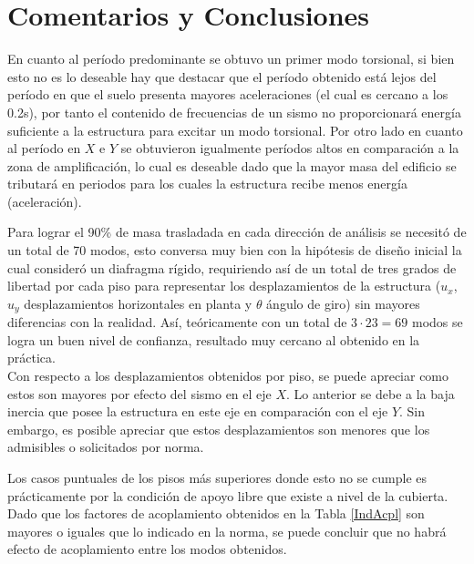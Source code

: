 \newpage
\section{Comentarios y Conclusiones}

En cuanto al período predominante se obtuvo un primer modo torsional, si bien esto no es lo deseable hay que destacar que el período obtenido está lejos del período en que el suelo presenta mayores aceleraciones (el cual es cercano a los 0.2s), por tanto el contenido de frecuencias de un sismo no proporcionará energía suficiente a la estructura para excitar un modo torsional. Por otro lado en cuanto al período en $X$ e $Y$ se obtuvieron igualmente períodos altos en comparación a la zona de amplificación, lo cual es deseable dado que la mayor masa del edificio se tributará en periodos para los cuales la estructura recibe menos energía (aceleración).
    

Para lograr el 90\% de masa trasladada en cada dirección de análisis se necesitó de un total de 70 modos, esto conversa muy bien con la hipótesis de diseño inicial la cual consideró un diafragma rígido, requiriendo así de un total de tres grados de libertad por cada piso para representar los desplazamientos de la estructura ($u_x$, $u_y$ desplazamientos horizontales en planta y $\theta$ ángulo de giro) sin mayores diferencias con la realidad.  Así, teóricamente con un total de $3 \cdot 23 = 69$ modos se logra un buen nivel de confianza, resultado muy cercano al obtenido en la práctica. \\

Con respecto a los desplazamientos obtenidos por piso, se puede apreciar como estos son mayores por efecto del sismo en el eje $X$. Lo anterior se debe a la baja inercia que posee la estructura en este eje en comparación con el eje $Y$. Sin embargo, es posible apreciar que estos desplazamientos son menores que los admisibles o solicitados por norma.

Los casos puntuales de los pisos más superiores donde esto no se cumple es prácticamente por la condición de apoyo libre que existe a nivel de la cubierta. \\
    
Dado que los factores de acoplamiento obtenidos en la Tabla \ref{IndAcpl} son mayores o iguales que lo indicado en la norma, se puede concluir que no habrá efecto de acoplamiento entre los modos obtenidos. \\

